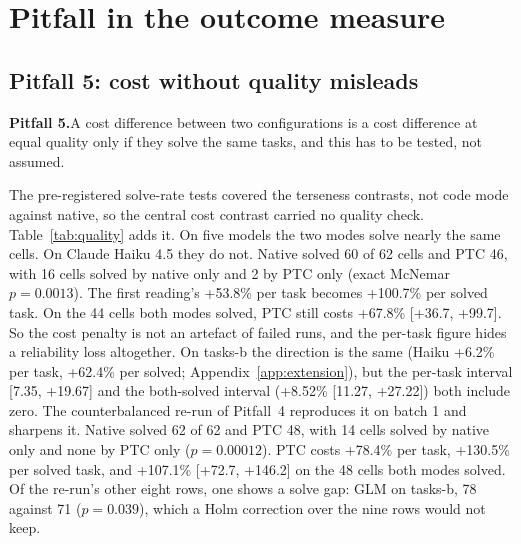 \documentclass[10pt]{article}
\newcommand*{\mi}{\textminus}   %
\newenvironment{pitfall}[1]{\par\medskip\noindent\begin{lrbox}{\pitbox}\begin{minipage}{\dimexpr\linewidth-2\fboxsep-2\fboxrule\relax}\small\textbf{#1}\enskip}{\end{minipage}\end{lrbox}\fbox{\usebox{\pitbox}}\par\medskip}
\begin{document}
\section{Pitfall in the outcome measure}\label{sec:outcome}

\subsection{Pitfall 5: cost without quality misleads}\label{sec:p5}

\begin{pitfall}{Pitfall 5.}A cost difference between two configurations is a cost difference at equal
quality only if they solve the same tasks, and this has to be tested, not assumed.\end{pitfall}

The pre-registered solve-rate tests covered the terseness contrasts, not code mode against native, so
the central cost contrast carried no quality check. Table~\ref{tab:quality} adds it. On five models
the two modes solve nearly the same cells. On Claude Haiku 4.5 they do not. Native solved 60 of 62
cells and PTC 46, with 16 cells solved by native only and 2 by PTC only (exact McNemar $p = 0.0013$).
The first reading's +53.8\% per task becomes +100.7\% per solved task. On the 44 cells both modes
solved, PTC still costs +67.8\% [+36.7, +99.7]. So the cost penalty is not an artefact of failed
runs, and the per-task figure hides a reliability loss altogether. On tasks-b the direction is the same (Haiku +6.2\% per task, +62.4\% per solved;
Appendix~\ref{app:extension}), but the per-task interval [\mi{}7.35, +19.67] and the both-solved
interval (+8.52\% [\mi{}11.27, +27.22]) both include zero. The
counterbalanced re-run of Pitfall~4 reproduces it on batch 1 and sharpens it. Native solved 62 of 62
and PTC 48, with 14 cells solved by native only and none by PTC only ($p = 0.00012$). PTC costs
+78.4\% per task, +130.5\% per solved task, and +107.1\% [+72.7, +146.2] on the 48 cells both modes
solved. Of the re-run's other eight rows, one shows a solve gap: GLM on tasks-b, 78 against 71
($p = 0.039$), which a Holm correction over the nine rows would not keep.
\end{document}
